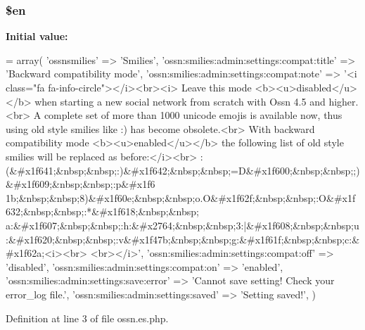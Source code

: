 \subsubsection[{\texorpdfstring{\$en}{$en}}]{\setlength{\rightskip}{0pt plus 5cm}\$en}\hypertarget{components_2_ossn_smilies_2locale_2ossn_8es_8php_a48abc714dfb71c8fffa83cf49f452115}{}\label{components_2_ossn_smilies_2locale_2ossn_8es_8php_a48abc714dfb71c8fffa83cf49f452115}
{\bfseries Initial value\+:}
\begin{DoxyCode}
= array(
        \textcolor{stringliteral}{'ossnsmilies'} => \textcolor{stringliteral}{'Smilies'},
        \textcolor{stringliteral}{'ossn:smilies:admin:settings:compat:title'} => \textcolor{stringliteral}{'Backward compatibility mode'},
        \textcolor{stringliteral}{'ossn:smilies:admin:settings:compat:note'} => \textcolor{stringliteral}{'<i class="fa fa-info-circle"></i><br><i>}
\textcolor{stringliteral}{        Leave this mode <b><u>disabled</u></b> when starting a new social network from scratch with Ossn
       4.5 and higher.<br>}
\textcolor{stringliteral}{        A complete set of more than 1000 unicode emojis is available now, thus using old style smilies like
       :) has become obsolete.<br>}
\textcolor{stringliteral}{        With backward compatibility mode <b><u>enabled</u></b> the following list of old style smilies will
       be replaced as before:</i><br>}
\textcolor{stringliteral}{        
      :(&#x1f641;&nbsp;&nbsp;:)&#x1f642;&nbsp;&nbsp;=D&#x1f600;&nbsp;&nbsp;;)&#x1f609;&nbsp;&nbsp;:p&#x1f6
      1b;&nbsp;&nbsp;8)&#x1f60e;&nbsp;&nbsp;o.O&#x1f62f;&nbsp;&nbsp;:O&#x1f632;&nbsp;&nbsp;:*&#x1f618;&nbsp;&nbsp;
      a:&#x1f607;&nbsp;&nbsp;:h:&#x2764;&nbsp;&nbsp;3:|&#x1f608;&nbsp;&nbsp;u:&#x1f620;&nbsp;&nbsp;:v&#x1f47b;&nbsp;&nbsp;g:&#x1f61f;&nbsp;&nbsp;c:&#x1f62a;<i><br>}
\textcolor{stringliteral}{        <br></i>'},
        \textcolor{stringliteral}{'ossn:smilies:admin:settings:compat:off'} => \textcolor{stringliteral}{'disabled'},
        \textcolor{stringliteral}{'ossn:smilies:admin:settings:compat:on'} => \textcolor{stringliteral}{'enabled'},
        \textcolor{stringliteral}{'ossn:smilies:admin:settings:save:error'} => \textcolor{stringliteral}{'Cannot save setting! Check your error\_log file.'},
        \textcolor{stringliteral}{'ossn:smilies:admin:settings:saved'} => \textcolor{stringliteral}{'Setting saved!'},
)
\end{DoxyCode}


Definition at line 3 of file ossn.\+es.\+php.

